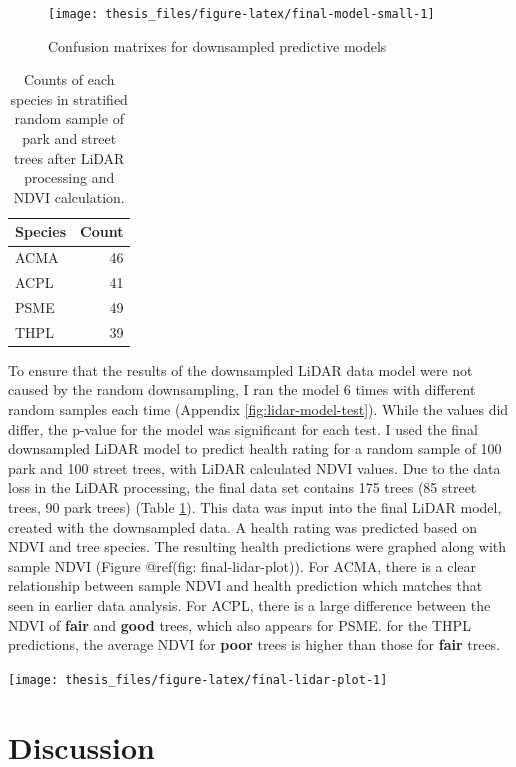 \documentclass[12pt,twoside]{reedthesis}
\begin{document}
\begin{figure}

{\centering \texttt{[image: thesis\_files/figure-latex/final-model-small-1]} 

}

\caption{Confusion matrixes for downsampled predictive models}\label{fig:final-model-small}
\end{figure}
\begin{longtable}[t]{lr}
\caption[Species counts post LiDAR processing]{\label{tab:final-lidar-counts}Counts of each species in stratified random sample of park and street trees after LiDAR processing and NDVI calculation.}\\
\toprule
Species & Count\\
\midrule
ACMA & 46\\
ACPL & 41\\
PSME & 49\\
THPL & 39\\
\bottomrule
\end{longtable}
To ensure that the results of the downsampled LiDAR data model were not caused by the random downsampling, I ran the model 6 times with different random samples each time (Appendix \ref{fig:lidar-model-test}). While the values did differ, the p-value for the model was significant for each test. I used the final downsampled LiDAR model to predict health rating for a random sample of 100 park and 100 street trees, with LiDAR calculated NDVI values. Due to the data loss in the LiDAR processing, the final data set contains 175 trees (85 street trees, 90 park trees) (Table \ref{tab:final-lidar-counts}). This data was input into the final LiDAR model, created with the downsampled data. A health rating was predicted based on NDVI and tree species. The resulting health predictions were graphed along with sample NDVI (Figure @ref(fig: final-lidar-plot)). For ACMA, there is a clear relationship between sample NDVI and health prediction which matches that seen in earlier data analysis. For ACPL, there is a large difference between the NDVI of \textbf{fair} and \textbf{good} trees, which also appears for PSME. for the THPL predictions, the average NDVI for \textbf{poor} trees is higher than those for \textbf{fair} trees.
\begin{center}\texttt{[image: thesis\_files/figure-latex/final-lidar-plot-1]} \end{center}

\hypertarget{discussion}{%
\chapter{Discussion}\label{discussion}}
\end{document}
